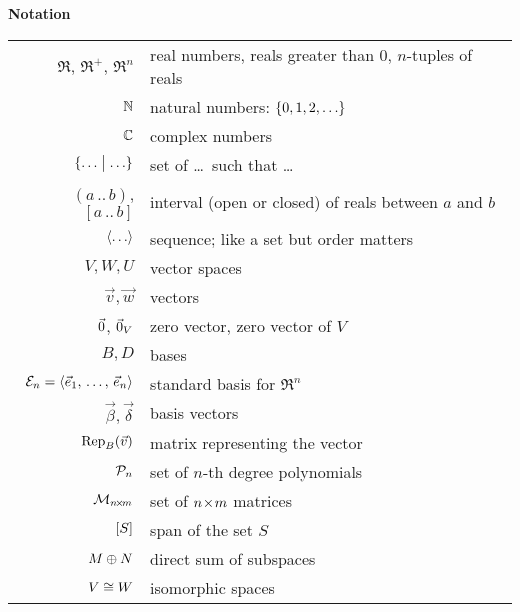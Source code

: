 %

%
%
\thispagestyle{empty}
\vfill
\begin{center}
\textbf{Notation}
\end{center}
\begin{center}
  \begin{tabular}{r|l}
    \( \Re \), \( \Re^+ \), \( \Re^n \) &real numbers, reals greater than $0$, $n$-tuples of reals \\
    \( \N              \)  &natural numbers: \( \set{0,1,2,\ldots} \) \\
    \( \C              \)  &complex numbers                           \\
    \( \set{\ldots\suchthat\ldots} \) &set of \ldots\ such that \ldots  \\
    \( (a\,..\,b) \), \( [a\,..\,b] \) &interval (open or closed) of reals between $a$ and $b$  \\
    \( \sequence{\ldots} \)&sequence; like a set but order matters    \\
    \( V,W,U \)            &vector spaces                             \\
    \( \vec{v},\vec{w} \)  &vectors                                   \\
    $\zero$, $\zero_V$     &zero vector, zero vector of $V$           \\
    \( B,D \)              &bases                                     \\
    \( \stdbasis_n=\sequence{\vec{e}_1,\,\ldots,\,\vec{e}_n} \)      
                          &standard basis for $\Re^n$                \\
    \( \vec{\beta},\vec{\delta} \)
                           &basis vectors                             \\
    \( \rep{\vec{v}}{B} \) &matrix representing the vector            \\
    \( \polyspace_n \)     &set of \( n \)-th degree polynomials      \\
    \( \matspace_{\nbym{n}{m}} \)  &set of \( \nbym{n}{m} \) matrices    \\
    \( \spanof{S} \)       &span of the set \( S \)                   \\
    \( M\directsum N \)    &direct sum of subspaces                   \\
    \( V\isomorphicto W \) &isomorphic spaces                         \\

\end{tabular}
\end{center}
